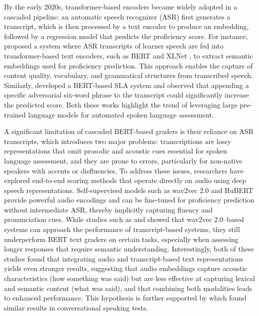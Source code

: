 \documentclass{report}
\begin{document}
By the early 2020s, transformer-based encoders became widely adopted in a cascaded pipeline: an automatic speech recognizer (ASR) first generates a transcript, which is then processed by a text encoder to produce an embedding, followed by a regression model that predicts the proficiency score. For instance, \citet{bert_1} proposed a system where ASR transcripts of learner speech are fed into transformer-based text encoders, such as BERT \citep{devlin2019bertpretrainingdeepbidirectional} and XLNet \citep{yang2020xlnetgeneralizedautoregressivepretraining}, to extract semantic embeddings used for proficiency prediction. This approach enables the capture of content quality, vocabulary, and grammatical structures from transcribed speech. Similarly, \citet{raina20_interspeech} developed a BERT-based SLA system and observed that appending a specific adversarial six-word phrase to the transcript could significantly increase the predicted score. Both these works highlight the trend of leveraging large pre-trained language models for automated spoken language assessment.

A significant limitation of cascaded BERT-based graders is their reliance on ASR transcripts, which introduces two major problems: transcriptions are lossy representations that omit prosodic and acoustic cues essential for spoken language assessment, and they are prone to errors, particularly for non-native speakers with accents or disfluencies. To address these issues, researchers have explored end-to-end scoring methods that operate directly on audio using deep speech representations. Self-supervised models such as wav2vec 2.0 \citep{baevski2020wav2vec20frameworkselfsupervised} and HuBERT \citep{hsu2021hubertselfsupervisedspeechrepresentation} provide powerful audio encodings and can be fine-tuned for proficiency prediction without intermediate ASR, thereby implicitly capturing fluency and pronunciation cues. While studies such as \citet{bannò2022proficiencyassessmentl2spoken} and \citet{bannò2022l2proficiencyassessmentusing} showed that wav2vec 2.0–based systems can approach the performance of transcript-based systems, they still underperform BERT text graders on certain tasks, especially when assessing longer responses that require semantic understanding. Interestingly, both of these studies found that integrating audio and transcript-based text representations yields even stronger results, suggesting that audio embeddings capture acoustic characteristics (how something was said) but are less effective at capturing lexical and semantic content (what was said), and that combining both modalities leads to enhanced performance. This hypothesis is further supported by \citet{mcknight_civelekoglu_gales_banno_liusie_knill_2023} which found similar results in conversational speaking tests.
\end{document}
